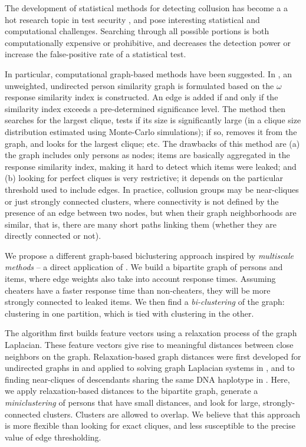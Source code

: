\documentclass{article}
\begin{document}
The development of statistical methods for detecting collusion has become a a hot research topic in test security \cite{test_fraud_book}, and pose interesting statistical and computational challenges. Searching through all possible portions is both computationally expensive or prohibitive, and decreases the detection power or increase the false-positive rate of a statistical test.

In particular, computational graph-based methods have been suggested. In \cite{belov}, an unweighted, undirected person similarity graph is formulated based on the $\omega$ response similarity index is constructed. An edge is added if and only if the similarity index exceeds a pre-determined significance level. The method then searches for the largest clique, tests if its size is significantly large (in a clique size distribution estimated using Monte-Carlo simulations); if so, removes it from the graph, and looks for the largest clique; etc. The drawbacks of this method are (a) the graph includes only persons as nodes; items are basically aggregated in the response similarity index, making it hard to detect which items were leaked; and (b) looking for perfect cliques is very restrictive; it depends on the particular threshold used to include edges. In practice, collusion groups may be near-cliques or just strongly connected clusters, where connectivity is not defined by the presence of an edge between two nodes, but when their graph neighborhoods are similar, that is, there are many short paths linking them (whether they are directly connected or not).

We propose a different graph-based biclustering approach inspired by {\it multiscale methods} -- a direct application of \cite[Sec.~10]{msgd}. We build a bipartite graph of persons and items, where edge weights also take into account response times. Assuming cheaters have a faster response time than non-cheaters, they will be more strongly connected to leaked items. We then find a {\it bi-clustering} of the graph: clustering in one partition, which is tied with clustering in the other.

The algorithm first builds feature vectors using a relaxation process of the graph Laplacian. These feature vectors give rise to meaningful distances between close neighbors on the graph. Relaxation-based graph distances were first developed for undirected graphs in \cite{safro} and applied to solving graph Laplacian systems in \cite{lamg}, and to finding near-cliques of descendants sharing the same DNA haplotype in \cite{primal}. Here, we apply relaxation-based distances to the bipartite graph, generate a {\it miniclustering} of persons that have small distances, and look for large, strongly-connected clusters. Clusters are allowed to overlap. We believe that this approach is more flexible than looking for exact cliques, and less susceptible to the precise value of edge thresholding.
\end{document}
